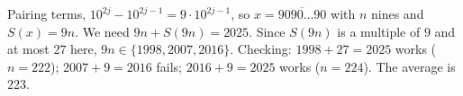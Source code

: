 Pairing terms, $10^{2j}-10^{2j-1}=9\cdot10^{2j-1}$, so $x=\overline{9090\ldots90}$ with $n$ nines and $S(x)=9n$. We need $9n+S(9n)=2025$. Since $S(9n)$ is a multiple of $9$ and at most $27$ here, $9n\in\{1998,2007,2016\}$. Checking: $1998+27=2025$ works ($n=222$); $2007+9=2016$ fails; $2016+9=2025$ works ($n=224$). The average is $\boxed{223}$.
